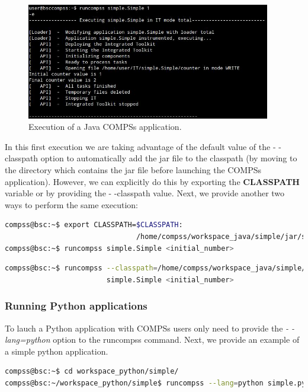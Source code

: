 \begin{figure}[h!]
  \centering
    \includegraphics[width=0.95\textwidth]{./Sections/2_Execution/Figures/java_execution.jpeg}
    \caption{Execution of a Java COMPSs application. \label{fig:java_execution}}
\end{figure}
\vspace{-0.4cm}

In this first execution we are taking advantage of the default value of the - -classpath option to automatically add the jar
file to the classpath (by moving to the directory which contains the jar file before launching the COMPSs application). However,
we can explicitly do this by exporting the \textbf{CLASSPATH} variable or by providing the 
- -classpath value. Next, we provide another two ways to perform the same execution:

\begin{lstlisting}[language=bash]
compss@bsc:~$ export CLASSPATH=$CLASSPATH:
                               /home/compss/workspace_java/simple/jar/simple.jar
compss@bsc:~$ runcompss simple.Simple <initial_number>
\end{lstlisting}

\begin{lstlisting}[language=bash]
compss@bsc:~$ runcompss --classpath=/home/compss/workspace_java/simple/jar/simple.jar 
                        simple.Simple <initial_number>
\end{lstlisting}


\subsubsection{Running Python applications}
To lauch a Python application with COMPSs users only need to provide the \textit{- -lang=python} option to the runcompss command. 
Next, we provide an example of a simple python application.

\begin{lstlisting}[language=bash]
compss@bsc:~$ cd workspace_python/simple/
compss@bsc:~/workspace_python/simple$ runcompss --lang=python simple.py <initial_number>
\end{lstlisting}

